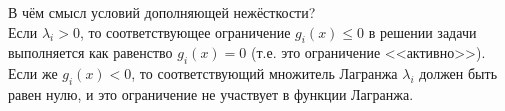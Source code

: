 \begin{remark}
В чём смысл условий дополняющей нежёсткости?\\
Если $\lambda_i > 0$, то соответствующее ограничение $g_i(x) \leqslant 0$ в решении задачи выполняется как равенство $g_i(x) = 0$ (т.е. это ограничение <<активно>>).\\
Если же $g_i(x) < 0$, то соответствующий множитель Лагранжа $\lambda_i$ должен быть равен нулю, и это ограничение не участвует в функции Лагранжа.
\end{remark}
